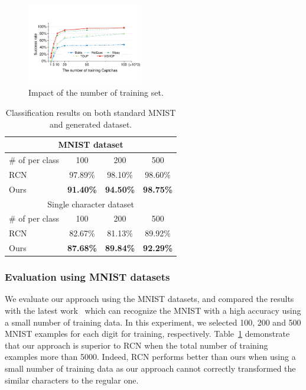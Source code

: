 \begin{figure}
  \centering
  \includegraphics[width=0.45\textwidth]{fig/training_set.pdf}
  \caption{Impact of the number of training set.}
  \label{fig: training_set}
\end{figure}

\begin{table}[t]
    \centering
    \caption{Classification results on both standard MNIST and generated dataset.}
    \label{table: mnist}
    \begin{tabular}{lccc}
        \toprule
        \multicolumn{4}{c}{MNIST dataset} \\
        \midrule
        \# of per class & 100  & 200 & 500\\
        \midrule
        RCN & 97.89\% & 98.10\% & 98.60\% \\
        Ours & \textbf{91.40\%} & \textbf{94.50\%} & \textbf{98.75\%} \\
        \toprule
        \multicolumn{4}{c}{Single character dataset} \\
        \midrule
        \# of per class & 100  & 200 & 500\\
        \midrule
        RCN & 82.67\% & 81.13\% & 89.92\% \\
        Ours & \textbf{87.68\%} & \textbf{89.84\%} & \textbf{92.29\%} \\
        \bottomrule
    \end{tabular}
\end{table}

\subsubsection{Evaluation using MNIST datasets}
We evaluate our approach using the MNIST datasets, and compared the results with the latest work~\cite{George2017A} which can recognize the MNIST with a high accuracy using a small number of training data. In this experiment, we selected 100, 200 and 500 MNIST examples for each digit for training, respectively.
Table~\ref{table: mnist} demonstrate that our approach is superior to RCN when the total number of training examples more than 5000. Indeed, RCN performs better than ours when using a small number of training data as our approach cannot correctly transformed the similar characters to the regular one.

